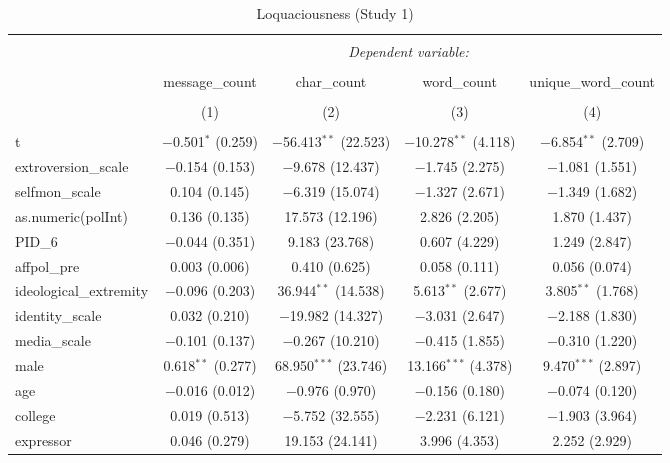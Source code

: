 
\begin{table}[H] \centering 
  \caption{Loquaciousness (Study 1)} 
  \label{tab:s1_loquaciousness} 
\begin{tabular}{@{\extracolsep{5pt}}lcccc} 
\\[-1.8ex]\hline 
\hline \\[-1.8ex] 
 & \multicolumn{4}{c}{\textit{Dependent variable:}} \\ 
\cline{2-5} 
\\[-1.8ex] & message\_count & char\_count & word\_count & unique\_word\_count \\ 
\\[-1.8ex] & (1) & (2) & (3) & (4)\\ 
\hline \\[-1.8ex] 
 t & $-$0.501$^{*}$ (0.259) & $-$56.413$^{**}$ (22.523) & $-$10.278$^{**}$ (4.118) & $-$6.854$^{**}$ (2.709) \\ 
  extroversion\_scale & $-$0.154 (0.153) & $-$9.678 (12.437) & $-$1.745 (2.275) & $-$1.081 (1.551) \\ 
  selfmon\_scale & 0.104 (0.145) & $-$6.319 (15.074) & $-$1.327 (2.671) & $-$1.349 (1.682) \\ 
  as.numeric(polInt) & 0.136 (0.135) & 17.573 (12.196) & 2.826 (2.205) & 1.870 (1.437) \\ 
  PID\_6 & $-$0.044 (0.351) & 9.183 (23.768) & 0.607 (4.229) & 1.249 (2.847) \\ 
  affpol\_pre & 0.003 (0.006) & 0.410 (0.625) & 0.058 (0.111) & 0.056 (0.074) \\ 
  ideological\_extremity & $-$0.096 (0.203) & 36.944$^{**}$ (14.538) & 5.613$^{**}$ (2.677) & 3.805$^{**}$ (1.768) \\ 
  identity\_scale & 0.032 (0.210) & $-$19.982 (14.327) & $-$3.031 (2.647) & $-$2.188 (1.830) \\ 
  media\_scale & $-$0.101 (0.137) & $-$0.267 (10.210) & $-$0.415 (1.855) & $-$0.310 (1.220) \\ 
  male & 0.618$^{**}$ (0.277) & 68.950$^{***}$ (23.746) & 13.166$^{***}$ (4.378) & 9.470$^{***}$ (2.897) \\ 
  age & $-$0.016 (0.012) & $-$0.976 (0.970) & $-$0.156 (0.180) & $-$0.074 (0.120) \\ 
  college & 0.019 (0.513) & $-$5.752 (32.555) & $-$2.231 (6.121) & $-$1.903 (3.964) \\ 
  expressor & 0.046 (0.279) & 19.153 (24.141) & 3.996 (4.353) & 2.252 (2.929) \\ 

\end{tabular}
\end{table}
